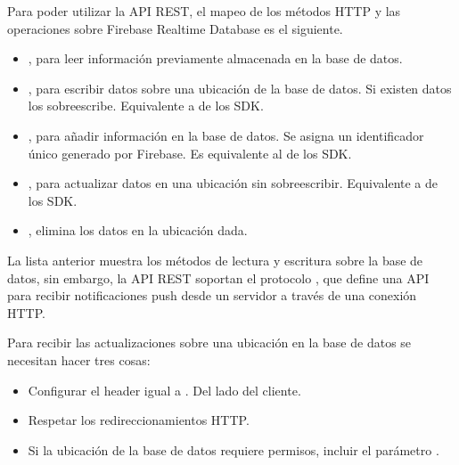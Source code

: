 Para poder utilizar la API REST, el mapeo de los métodos
HTTP y las operaciones sobre Firebase Realtime Database es el siguiente.
\begin{itemize}
\item {} 
, para leer información previamente almacenada en la base de datos.

\item {} 
, para escribir datos sobre una ubicación de la base de datos. Si existen datos los sobreescribe. Equivalente a  de los SDK.

\item {} 
, para añadir información en la base de datos. Se asigna un identificador único generado por Firebase. Es equivalente al  de los SDK.

\item {} 
, para actualizar datos en una ubicación sin sobreescribir. Equivalente a  de los SDK.

\item {} 
, elimina los datos en la ubicación dada.

\end{itemize}

La lista anterior muestra los métodos de lectura y escritura sobre la base
de datos, sin embargo, la API REST soportan el protocolo ,
que define una API para recibir notificaciones push desde un servidor a través
de una conexión HTTP.

Para recibir las actualizaciones sobre una ubicación en la base de datos se
necesitan hacer tres cosas:
\begin{itemize}
\item {} 
Configurar el header  igual a . Del lado del cliente.

\item {} 
Respetar los redireccionamientos HTTP.

\item {} 
Si la ubicación de la base de datos requiere permisos, incluir el parámetro .

\end{itemize}

